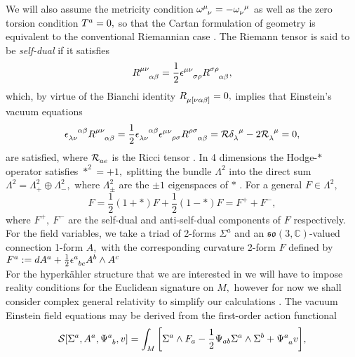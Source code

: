 \documentclass[a4paper,12pt, onecolumn, notitlepage]{article}
\theoremstyle{definition}
\theoremstyle{remark}
\newcommand{\al}{\alpha}
\newcommand{\w}{\omega}
\newcommand{\m}{\mu}
\newcommand{\n}{\nu}
\newcommand{\e}{\epsilon}
\newcommand{\HK}{hyperk\"ahler }
\begin{document}
We will also assume the metricity condition $\w\indices{^\m_\n}=-\w\indices{_\n^\m}$ as well as the zero torsion condition $T\indices{^a}=0,$ so that the Cartan formulation of geometry is equivalent to the conventional Riemannian case \cite{eguchi_1980}. The Riemann tensor is said to be \emph{self-dual} if it satisfies
\begin{equation*}
	R\indices{^\m^\n_\al_\beta} = \frac{1}{2}\e\indices{^\m^\n_\sigma_\rho}R\indices{^\sigma^\rho_\al_\beta},
\end{equation*}
which, by virtue of the Bianchi identity $R\indices{_\m_{[\n\al\beta]}}=0,$ implies that Einstein's vacuum equations
\begin{equation*}
	\e\indices{_{\lambda\n}^{\al\beta}}R\indices{^{\m\n}_{\al\beta}}=\frac{1}{2}\e\indices{_{\lambda\n}^{\al\beta}}\e\indices{^{\m\n}_{\rho\sigma}}R\indices{^{\rho\sigma}_{\al\beta}}= \mathcal{R}\delta\indices{_{\lambda}^\m}-2\mathcal{R}\indices{_\lambda^\m}=0,
\end{equation*}
are satisfied, where $\mathcal{R}\indices{_{ae}}$ is the Ricci tensor \cite{eguchi_1980}. In 4 dimensions the Hodge-$\ast$ operator satisfies $\ast^{2}=+1,$ splitting the bundle $\Lambda^{2}$ into the direct sum $\Lambda^{2}=\Lambda^{2}_{+}\oplus\Lambda^{2}_{-},$ where $\Lambda^{2}_{\pm}$ are the $\pm 1$ eigenspaces of $\ast$ \cite{atiyah_1978}. For a general $F\in\Lambda^{2},$
\begin{equation*}
	F = \frac{1}{2}(1+\ast)F + \frac{1}{2}(1-\ast)F = F^{+} + F^{-},
\end{equation*}
where $F^{+},\ F^{-}$ are the self-dual and anti-self-dual components of $F$ respectively.\\
For the field variables, we take a triad of 2-forms $\Sigma^{a}$ and an $\mathfrak{so}(3,\mathbb{C})$-valued connection 1-form $A,$ with the corresponding curvature 2-form $F$ defined by $F\indices{^a}:=dA\indices{^a}+\frac{1}{2}\e\indices{^a_b_c}A\indices{^b}\wedge A\indices{^c}$ \cite{capovilla_1989}\\
For the \HK structure that we are interested in we will have to impose reality conditions for the Euclidean signature on $M,$ however for now we shall consider complex general relativity to simplify our calculations \cite{capovilla_1993}.
The vacuum Einstein field equations may be derived from the first-order action functional
\begin{equation}
\label{action}
\mathcal{S}[\Sigma^{a}, A^{a}, \Psi\indices{^a_b}, v] = \int_{M}\bigg[\Sigma^{a}\wedge F_{a} - \frac{1}{2}\Psi_{ab}\Sigma^{a}\wedge\Sigma^{b} + \Psi\indices{^a_a}v\bigg],
\end{equation}
\end{document}
